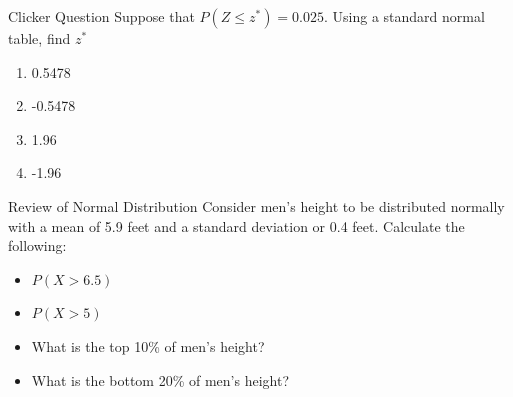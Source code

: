 \documentclass{beamer}
\begin{document}
\begin{frame}{Clicker Question}
	Suppose that $P(Z\leq z^*) = 0.025$. Using a standard normal table, find $z^*$
	
	\begin{enumerate}[label=(\alph*)]
		\item 0.5478
		\item -0.5478
		\item 1.96
		\item -1.96
	\end{enumerate}
\end{frame}

\begin{frame}[t]{Review of Normal Distribution}
	Consider men's height to be distributed normally with a mean of 5.9 feet and a standard deviation or 0.4 feet.
	Calculate the following:
	\begin{itemize}
		\item $P(X>6.5)$
		      
		\item $P(X>5)$
		      
		\item What is the top 10\% of men's height?
		      
		\item What is the bottom 20\% of men's height?
	\end{itemize}
\end{frame}

\begin{frame}

\end{frame}
\end{document}
